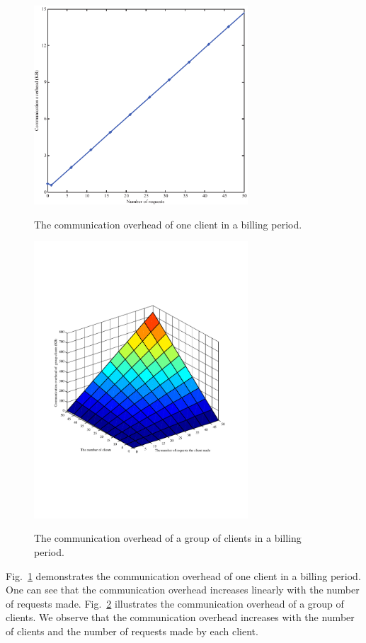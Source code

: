 \documentclass[letterpaper,12pt]{article}
\begin{document}
%
\begin{figure}[!htb] \centering
  \includegraphics[width=8.0cm]{Communicationoverhead_Client}\\
  \caption{The communication overhead of one client in a billing period.} \label{sec:Communicationoverhead_Client}
\end{figure}
%
\begin{figure}[!htb] \centering
  \includegraphics[width=8.0cm]{Communicationoverhead_Group_Clients}\\
  \caption{The communication overhead of a group of clients in a billing period.} \label{sec:Communicationoverhead__group_Client}
\end{figure}
%
Fig.~\ref{sec:Communicationoverhead_Client} demonstrates the communication overhead of one client in a billing period. One can see that the communication overhead increases linearly with the number of requests made. Fig.~\ref{sec:Communicationoverhead__group_Client} illustrates the communication overhead of a group of clients. We observe that the communication overhead increases with the number of clients and the number of requests made by each client.
\end{document}
